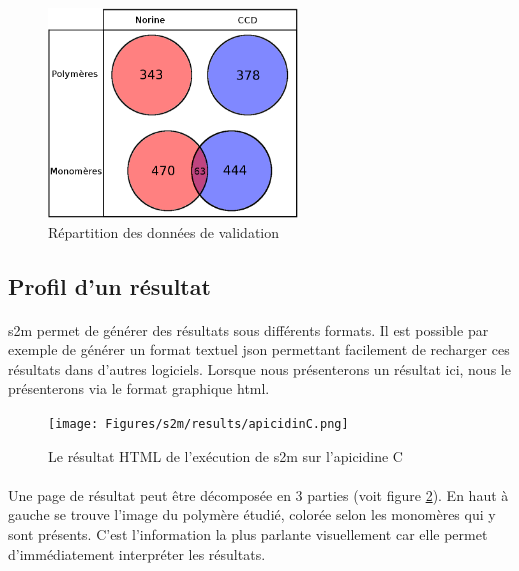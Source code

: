 \documentclass[12pt,french,twoside]{report}
\begin{document}
\begin{figure}[!ht]
  \begin{center}
    \includegraphics[width=250px]{Figures/s2m/results/data.png}
    \caption{\label{data}Répartition des données de validation}
  \end{center}
\end{figure}



\subsection{Profil d'un résultat}

\paragraph{}s2m permet de générer des résultats sous différents formats.
Il est possible par exemple de générer un format textuel json permettant facilement de recharger ces résultats dans d'autres logiciels.
Lorsque nous présenterons un résultat ici, nous le présenterons via le format graphique html.

\begin{figure}[!ht]
  \begin{center}
    \texttt{[image: Figures/s2m/results/apicidinC.png]}
    \caption{\label{s2m_HTML}Le résultat HTML de l'exécution de s2m sur l'apicidine C}
  \end{center}
\end{figure}

\paragraph{}Une page de résultat peut être décomposée en 3 parties (voit figure \ref{s2m_HTML}).
En haut à gauche se trouve l'image du polymère étudié, colorée selon les monomères qui y sont présents.
C'est l'information la plus parlante visuellement car elle permet d'immédiatement interpréter les résultats.
\end{document}
